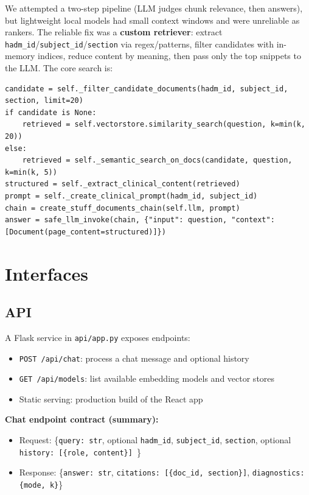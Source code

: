 We attempted a two-step pipeline (LLM judges chunk relevance, then answers), but lightweight local models had small context windows and were unreliable as rankers. The reliable fix was a \textbf{custom retriever}: extract \texttt{hadm\_id}/\texttt{subject\_id}/\texttt{section} via regex/patterns, filter candidates with in-memory indices, reduce content by meaning, then pass only the top snippets to the LLM. The core search is:
\begin{verbatim}
candidate = self._filter_candidate_documents(hadm_id, subject_id, section, limit=20)
if candidate is None:
    retrieved = self.vectorstore.similarity_search(question, k=min(k, 20))
else:
    retrieved = self._semantic_search_on_docs(candidate, question, k=min(k, 5))
structured = self._extract_clinical_content(retrieved)
prompt = self._create_clinical_prompt(hadm_id, subject_id)
chain = create_stuff_documents_chain(self.llm, prompt)
answer = safe_llm_invoke(chain, {"input": question, "context": [Document(page_content=structured)]})
\end{verbatim}


\section{Interfaces}

\subsection{API}
A Flask service in \texttt{api/app.py} exposes endpoints:
\begin{itemize}
  \item \texttt{POST /api/chat}: process a chat message and optional history
  \item \texttt{GET /api/models}: list available embedding models and vector stores
  \item Static serving: production build of the React app
\end{itemize}

\noindent \textbf{Chat endpoint contract (summary):}
\begin{itemize}
  \item Request: \{\texttt{query: str}, optional \texttt{hadm\_id}, \texttt{subject\_id}, \texttt{section}, optional \texttt{history: [\{role, content\}] }\}
  \item Response: \{\texttt{answer: str}, \texttt{citations: [\{doc\_id, section\}]}, \texttt{diagnostics: \{mode, k\}}\}
\end{itemize}

